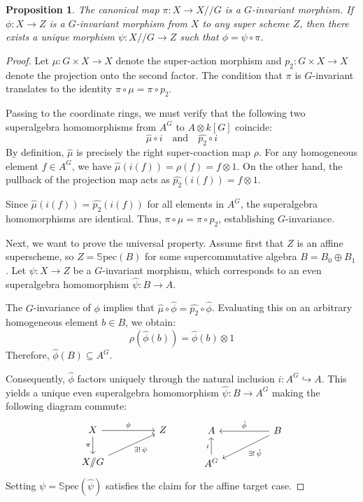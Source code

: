 \documentclass[12pt, reqno]{amsart}
\theoremstyle{plain}
\newtheorem{proposition}[theorem]{Proposition}
\numberwithin{equation}{section}
\newcommand{\Spec}[1]{\mathbb{S}\mathrm{pec}(#1)}
\begin{document}
\begin{proposition}\label{prop:affine_GIT}
    The canonical map $\pi: X \to X / \! \!/ G$ is a $G$-invariant morphism. If $\phi:X \to Z$ is a $G$-invariant morphism from $X$ to any super scheme $Z$, then there exists a unique morphism $\psi: X / \! \!/ G \to Z$ such that $\phi = \psi \circ \pi$.
\end{proposition}
\begin{proof}
    
Let $\mu: G \times X \to X$ denote the super-action morphism and $p_2: G \times X \to X$ denote the projection onto the second factor. The condition that $\pi$ is $G$-invariant translates to the identity $\pi \circ \mu = \pi \circ p_2$. 

Passing to the coordinate rings, we must verify that the following two superalgebra homomorphisms from $A^G$ to $A \otimes k[G]$ coincide:
\[ \hat{\mu} \circ i \quad \text{and} \quad \hat{p_2} \circ i \]
By definition, $\hat{\mu}$ is precisely the right super-coaction map $\rho$. For any homogeneous element $f \in A^G$, we have $\hat{\mu}(i(f)) = \rho(f) = f \otimes 1$. On the other hand, the pullback of the projection map acts as $\hat{p_2}(i(f)) = f \otimes 1$.

Since $\hat{\mu}(i(f)) = \hat{p_2}(i(f))$ for all elements in $A^G$, the superalgebra homomorphisms are identical. Thus, $\pi \circ \mu = \pi \circ p_2$, establishing $G$-invariance.

Next, we want to prove the universal property. Assume first that $Z$ is an affine superscheme, so $Z = \Spec{B}$
for some supercommutative algebra $B = B_0 \oplus B_1$. Let $\psi: X \to Z$ be a $G$-invariant morphism, which corresponds to an even superalgebra homomorphism $\hat{\psi}: B \to A$. 

The $G$-invariance of $\phi$ implies that $\hat{\mu} \circ \hat{\phi} = \hat{p_2} \circ \hat{\phi}$. Evaluating this on an arbitrary homogeneous element $b \in B$, we obtain:
\[ \rho(\hat{\phi}(b)) = \hat{\phi}(b) \otimes 1 \]
Therefore, $\hat{\phi}
(B) \subseteq A^{G}$. 

Consequently, $\hat{\phi}$ factors uniquely through the natural inclusion $i: A^G \hookrightarrow A$. This yields a unique even superalgebra homomorphism $\hat{\psi}: B \to A^{G}$ making the following diagram commute:
\[
\begin{tikzcd}
X \arrow[rr, "\phi"] \arrow[d, "\pi"'] & & Z
\\
X / \! \!/ G \arrow[rru, "\exists! \, \psi"'] & & 
\end{tikzcd}
\quad \quad \quad
\begin{tikzcd}
A & & B \arrow[ll, "\hat{\phi}"'] \arrow[lld, "\exists! \, \hat{\psi}"] \\
A^G \arrow[u, "i"] & & 
\end{tikzcd}
\]
Setting $\psi = \Spec{\hat{\psi}}$ satisfies the claim for the affine target case.


\end{proof}
\end{document}
